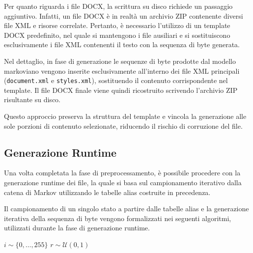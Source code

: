 \documentclass{report}
\begin{document}
\bigskip

Per quanto riguarda i file DOCX, la scrittura su disco richiede un passaggio
aggiuntivo. Infatti, un file DOCX è in realtà un archivio ZIP contenente diversi
file XML e risorse correlate. 
Pertanto, è necessario l'utilizzo di un template DOCX predefinito, nel quale si mantengono i file 
ausiliari e si sostituiscono esclusivamente i file XML contenenti il testo con la sequenza di byte generata.

\bigskip

Nel dettaglio, in fase di generazione le sequenze di byte prodotte dal modello markoviano
vengono inserite esclusivamente all'interno dei file XML principali
(\texttt{document.xml} e \texttt{styles.xml}), sostituendo il contenuto
corrispondente nel template. Il file DOCX finale viene quindi ricostruito
scrivendo l'archivio ZIP risultante su disco.

\bigskip

Questo approccio preserva la struttura del template e vincola la generazione alle sole porzioni di contenuto selezionate,
riducendo il rischio di corruzione del file.



\subsection{Generazione Runtime}

Una volta completata la fase di preprocessamento, è possibile procedere con la generazione runtime
dei file, la quale si basa sul campionamento iterativo dalla catena di Markov
utilizzando le tabelle alias costruite in precedenza.

\bigskip

Il campionamento di un singolo stato a partire dalle tabelle alias e la
generazione iterativa della sequenza di byte vengono formalizzati nei seguenti
algoritmi, utilizzati durante la fase di generazione runtime.

\bigskip

\begin{algorithm}[H]
\caption{sampleAlias}


$i \sim \{0,\dots,255\}$\;
$r \sim \mathcal{U}(0,1)$\;

\end{algorithm}

\bigskip
\end{document}
